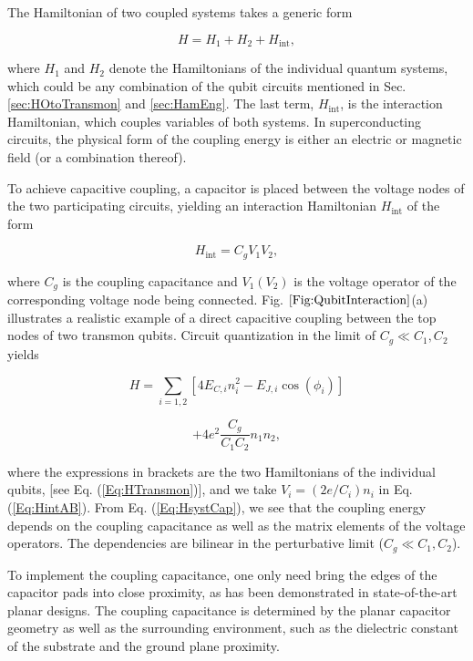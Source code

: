 \documentclass[aip,apr,twocolumn,showpacs,superscriptaddress,groupedaddress,nofootinbib,reprint]{revtex4-1}  %
\begin{document}
The Hamiltonian of two coupled systems takes a generic form

\begin{equation}
H = H_1 + H_2 + H_{\text{int}},
\label{Eq:Hcoupling}
\end{equation}

\noindent where $H_1$ and $H_2$ denote the Hamiltonians of the individual quantum systems, which could be any combination of the qubit circuits mentioned in Sec. \ref{sec:HOtoTransmon} and \ref{sec:HamEng}. The last term, $H_{\text{int}}$, is the interaction Hamiltonian, which couples variables of both systems. In superconducting circuits, the physical form of the coupling energy is either an electric or magnetic field (or a combination thereof).

To achieve capacitive coupling, a capacitor is placed between the voltage nodes of the two participating circuits, yielding an interaction Hamiltonian $H_{\text{int}}$ of the form

\begin{equation}
H_{\text{int}} = C_g V_1 V_2,
\label{Eq:HintAB}
\end{equation}

\noindent where $C_g$ is the coupling capacitance and $V_1 (V_2)$ is the voltage operator of the corresponding voltage node being connected. Fig. $\ref{Fig:QubitInteraction}$(a) illustrates a realistic example of a direct capacitive coupling between the top nodes of two transmon qubits. Circuit quantization in the limit of $C_g \ll C_1,C_2$ yields

\begin{equation*}
H = \sum_{i = 1,2} \left[ 4E_{C,i}n_{i}^2 - E_{J,i}\cos(\phi_i)\right]
\end{equation*}

\begin{equation}
+ 4e^2\frac{C_g}{C_1 C_2}n_1 n_2,
\label{Eq:HsystCap}
\end{equation}

\noindent where the expressions in brackets are the two Hamiltonians of the individual qubits, [see Eq. (\ref{Eq:HTransmon})], and we take $V_i = (2e/C_i)n_i$ in Eq. (\ref{Eq:HintAB}). From Eq. (\ref{Eq:HsystCap}), we see that the coupling energy depends on the coupling capacitance as well as the matrix elements of the voltage operators. The dependencies are bilinear in the perturbative limit ($C_g \ll C_1, C_2$).

To implement the coupling capacitance, one only need bring the edges of the capacitor pads into close proximity, as has been demonstrated in state-of-the-art planar designs\cite{Barends2013}. The coupling capacitance is determined by the planar capacitor geometry as well as the surrounding environment, such as the dielectric constant of the substrate and the ground plane proximity.
\end{document}
